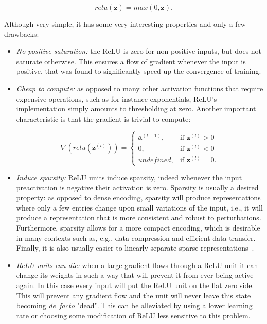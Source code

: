 \begin{equation}\label{eq:relu}
    relu(\mathbf{z}) = max(0, \mathbf{z}).
\end{equation}

Although very simple, it has some very interesting properties and only a few
drawbacks:

\begin{itemize}
    \item \emph{No positive saturation:} the ReLU is zero for non-positive
        inputs, but does not saturate otherwise. This ensures a flow of
        gradient whenever the input is positive, that was found to
        significantly speed up the convergence of training.
    \item \emph{Cheap to compute:} as opposed to many other activation
        functions that require expensive operations, such as for instance
        exponentials, ReLU's implementation simply amounts to thresholding at
        zero. Another important characteristic is that the gradient is trivial
        to compute:

        \begin{equation}\label{eq:relu_derivative}
            \nabla (relu(\mathbf{z}^{(l)})) =
                \begin{cases}
                    \mathbf{a}^{(l-1)},  & \text{if } \mathbf{z}^{(l)} > 0 \\
                    0,          & \text{if } \mathbf{z}^{(l)} < 0 \\
                    undefined,  & \text{if } \mathbf{z}^{(l)} = 0.
                \end{cases}
        \end{equation}

    \item \emph{Induce sparsity:} ReLU units induce sparsity, indeed whenever
        the input preactivation is negative their activation is zero. Sparsity
        is usually a desired property: as opposed to dense encoding, sparsity
        will produce representations where only a few entries change upon small
        variations of the input, i.e., it will produce a representation that is
        more consistent and robust to perturbations. Furthermore, sparsity
        allows for a more compact encoding, which is desirable in many contexts
        such as, e.g., data compression and efficient data transfer.  Finally,
        it is also usually easier to linearly separate sparse
        representations~\citep{Glorot+al-AI-2011-small}.
    \item \emph{ReLU units can die:} when a large gradient flows through a ReLU
        unit it can change its weights in such a way that will prevent it from
        ever being active again. In this case every input will put the ReLU
        unit on the flat zero side. This will prevent any gradient flow and the
        unit will never leave this state becoming \emph{de~facto} "dead". This
        can be alleviated by using a lower learning rate or choosing some
        modification of ReLU less sensitive to this problem.
\end{itemize}

